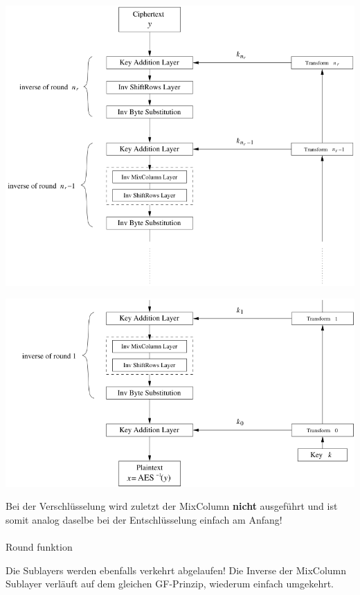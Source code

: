 \documentclass[
  10pt,
  a4paper,
]{article}
\makeatletter
\let\oldparagraph\paragraph
\renewcommand{\paragraph}{
    \@ifstar
      \xxxParagraphStar
      \xxxParagraphNoStar
  }
\newcommand{\xxxParagraphStar}[1]{\oldparagraph*{#1}\mbox{}}
\newcommand{\xxxParagraphNoStar}[1]{\oldparagraph{#1}\mbox{}}
\makeatother
\begin{document}
\begin{multicols*}{2}
\includegraphics{images/crypto/image-13.png}

\includegraphics{images/crypto/image-14.png}

Bei der Verschlüsselung wird zuletzt der MixColumn \textbf{nicht}
ausgeführt und ist somit analog daselbe bei der Entschlüsselung einfach
am Anfang!

\paragraph{Round funktion}\label{round-funktion}

Die Sublayers werden ebenfalls verkehrt abgelaufen! Die Inverse der
MixColumn Sublayer verläuft auf dem gleichen GF-Prinzip, wiederum
einfach umgekehrt.


\end{multicols*}
\end{document}
